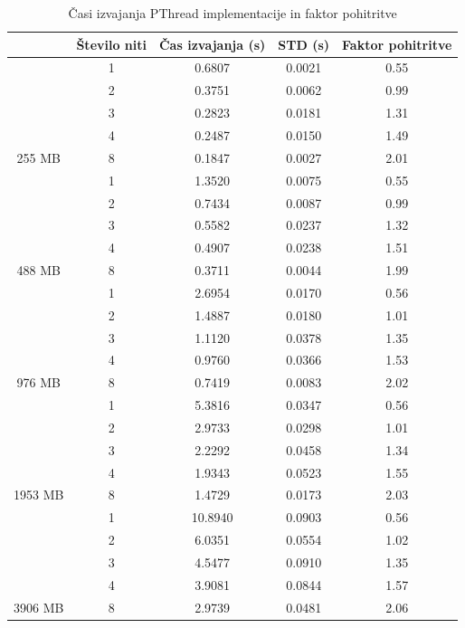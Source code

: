 \documentclass[a4paper,11pt]{article}
\begin{document}
\begin{table}[h]
\centering
\begin{tabular}{|c|c|c|c|c|}
\hline
\rowcolor[HTML]{C0C0C0} 
\multicolumn{1}{|l|}{\cellcolor[HTML]{C0C0C0}\textbf{Velikost problema}} & \multicolumn{1}{l|}{\cellcolor[HTML]{C0C0C0}\textbf{Število niti}} & \multicolumn{1}{l|}{\cellcolor[HTML]{C0C0C0}\textbf{Čas izvajanja (s)}} & \multicolumn{1}{l|}{\cellcolor[HTML]{C0C0C0}\textbf{STD (s)}} & \multicolumn{1}{l|}{\cellcolor[HTML]{C0C0C0}\textbf{Faktor pohitritve}} \\ \hline
 & 1 & 0.6807 & 0.0021 & 0.55 \\ \cline{2-5} 
 & 2 & 0.3751 & 0.0062 & 0.99 \\ \cline{2-5} 
 & 3 & 0.2823 & 0.0181 & 1.31 \\ \cline{2-5} 
 & 4 & 0.2487 & 0.0150 & 1.49 \\ \cline{2-5} 
\multirow{-5}{*}{255 MB} & 8 & 0.1847 & 0.0027 & 2.01 \\ \hline
 
 & 1 & 1.3520 & 0.0075 & 0.55 \\ \cline{2-5} 
 & 2 & 0.7434 & 0.0087 & 0.99 \\ \cline{2-5} 
 & 3 & 0.5582 & 0.0237 & 1.32 \\ \cline{2-5} 
 & 4 & 0.4907 & 0.0238 & 1.51 \\ \cline{2-5} 
\multirow{-5}{*}{488 MB} & 8 & 0.3711 & 0.0044 & 1.99 \\ \hline
 
 & 1 & 2.6954 & 0.0170 & 0.56 \\ \cline{2-5} 
 & 2 & 1.4887 & 0.0180 & 1.01 \\ \cline{2-5} 
 & 3 & 1.1120 & 0.0378 & 1.35 \\ \cline{2-5} 
 & 4 & 0.9760 & 0.0366 & 1.53 \\ \cline{2-5} 
\multirow{-5}{*}{976 MB} & 8 & 0.7419 & 0.0083 & 2.02 \\ \hline
 
 & 1 & 5.3816 & 0.0347 & 0.56 \\ \cline{2-5} 
 & 2 & 2.9733 & 0.0298 & 1.01 \\ \cline{2-5} 
 & 3 & 2.2292 & 0.0458 & 1.34 \\ \cline{2-5} 
 & 4 & 1.9343 & 0.0523 & 1.55 \\ \cline{2-5} 
\multirow{-5}{*}{1953 MB} & 8 & 1.4729 & 0.0173 & 2.03 \\ \hline

 & 1 & 10.8940 & 0.0903 & 0.56 \\ \cline{2-5} 
 & 2 & 6.0351 & 0.0554 & 1.02 \\ \cline{2-5} 
 & 3 & 4.5477 & 0.0910 & 1.35 \\ \cline{2-5} 
 & 4 & 3.9081 & 0.0844 & 1.57 \\ \cline{2-5} 
\multirow{-5}{*}{3906 MB} & 8 & 2.9739 & 0.0481 & 2.06 \\ \hline
\end{tabular}
\caption{Časi izvajanja PThread implementacije in faktor pohitritve}
\label{pthread}
\end{table}
\end{document}
